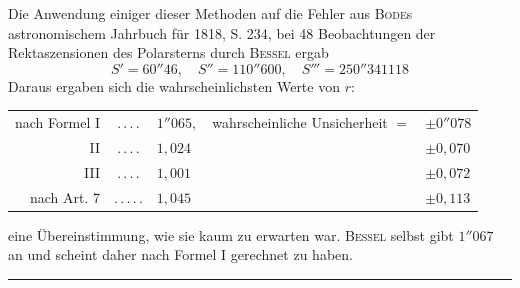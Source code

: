 Die Anwendung einiger dieser Methoden auf die Fehler aus \textsc{Bode}s astronomischem Jahrbuch für 1818, S. 234, bei 48 Beobachtungen der Rektaszensionen des Polarsterns durch \textsc{Bessel} ergab
\[
S'=60''46,\quad S''=110''600,\quad S'''=250''341118
\]
Daraus ergaben sich die wahrscheinlichsten Werte von \(r\):
\begin{center}
\begin{tabular}{r@{\;}c@{\;}l@{\quad}l@{\;}l}
nach Formel I&.\,.\,.\,.&\(1''065,\)&wahrscheinliche Unsicherheit \(=\)&\(\pm0''078\)\\
II&.\,.\,.\,.&\(1{,}024\)&&\(\pm0{,}070\)\\
III&.\,.\,.\,.&\(1{,}001\)&&\(\pm0{,}072\)\\
nach Art. 7&.\,.\,.\,.\,.&\(1{,}045\)&&\(\pm0{,}113\)
\end{tabular}
\end{center}
eine Übereinstimmung, wie sie kaum zu erwarten war. \textsc{Bessel} selbst gibt \(1''067\) an und scheint daher nach Formel I gerechnet zu haben.
\begin{center}\rule{.24\linewidth}{.3pt}\end{center}
